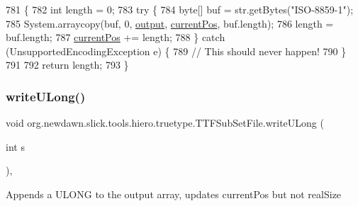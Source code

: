 \begin{DoxyCode}
781                                         \{
782         \textcolor{keywordtype}{int} length = 0;
783         \textcolor{keywordflow}{try} \{
784             byte[] buf = str.getBytes(\textcolor{stringliteral}{"ISO-8859-1"});
785             System.arraycopy(buf, 0, \mbox{\hyperlink{classorg_1_1newdawn_1_1slick_1_1tools_1_1hiero_1_1truetype_1_1_t_t_f_sub_set_file_a967f26c7cbd2c428f7ca96c4958edded}{output}}, \mbox{\hyperlink{classorg_1_1newdawn_1_1slick_1_1tools_1_1hiero_1_1truetype_1_1_t_t_f_sub_set_file_a5027011db0d9c307afa8de09102eaa10}{currentPos}}, buf.length);
786             length = buf.length;
787             \mbox{\hyperlink{classorg_1_1newdawn_1_1slick_1_1tools_1_1hiero_1_1truetype_1_1_t_t_f_sub_set_file_a5027011db0d9c307afa8de09102eaa10}{currentPos}} += length;
788         \} \textcolor{keywordflow}{catch} (UnsupportedEncodingException e) \{
789             \textcolor{comment}{// This should never happen!}
790         \}
791 
792         \textcolor{keywordflow}{return} length;
793     \}
\end{DoxyCode}
\mbox{\label{classorg_1_1newdawn_1_1slick_1_1tools_1_1hiero_1_1truetype_1_1_t_t_f_sub_set_file_a20ed1072913a1ad998d59a761e8c4817}} 
\subsubsection{\texorpdfstring{write\+U\+Long()}{writeULong()}\hspace{0.1cm}{\footnotesize\ttfamily [1/2]}}
{\footnotesize\ttfamily void org.\+newdawn.\+slick.\+tools.\+hiero.\+truetype.\+T\+T\+F\+Sub\+Set\+File.\+write\+U\+Long (\begin{DoxyParamCaption}\item[{int}]{s }\end{DoxyParamCaption})\hspace{0.3cm}{\ttfamily [inline]}, {\ttfamily [private]}}

Appends a U\+L\+O\+NG to the output array, updates current\+Pos but not real\+Size


